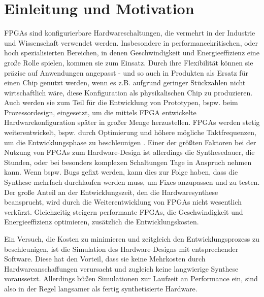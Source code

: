 \chapter{Einleitung und Motivation}

FPGAs sind konfigurierbare Hardwareschaltungen, die vermehrt in der Industrie und Wissenschaft verwendet werden.
Insbesondere in performancekritischen, oder hoch spezialisierten Bereichen, in denen Geschwindigkeit und Energieeffizienz eine große Rolle spielen, kommen sie zum Einsatz.
Durch ihre Flexibilität können sie präzise auf Anwendungen angepasst - und so auch in Produkten als Ersatz für einen Chip genutzt werden, wenn es z.B. aufgrund geringer Stückzahlen nicht wirtschaftlich wäre, diese Konfiguration als physikalischen Chip zu produzieren.
Auch werden sie zum Teil für die Entwicklung von Prototypen, bspw. beim Prozessordesign, eingesetzt, um die mittels FPGA entwickelte Hardwarekonfiguration später in großer Menge herzustellen.
FPGAs werden stetig weiterentwickelt, bspw. durch Optimierung und höhere mögliche Taktfrequenzen, um die Entwicklungsphase zu beschleunigen \textcite{boutros2021fpga, kuon2006measuring}.
Einer der größten Faktoren bei der Nutzung von FPGAs zum Hardware-Design ist allerdings die Synthesedauer, die Stunden, oder bei besonders komplexen Schaltungen Tage in Anspruch nehmen kann.
Wenn bspw. Bugs gefixt werden, kann dies zur Folge haben, dass die Synthese mehrfach durchlaufen werden muss, um Fixes anzupassen und zu testen.
Der große Anteil an der Entwicklungszeit, den die Hardwaresynthese beansprucht, wird durch die Weiterentwicklung von FPGAs nicht wesentlich verkürzt.
Gleichzeitig steigern performante FPGAs, die Geschwindigkeit und Energieeffizienz optimieren, zusätzlich die Entwicklungskosten.

Ein Versuch, die Kosten zu minimieren und zeitgleich den Entwicklungsprozess zu beschleunigen, ist die Simulation des Hardware-Designs mit entsprechender Software.
Diese hat den Vorteil, dass sie keine Mehrkosten durch Hardwareanschaffungen verursacht und zugleich keine langwierige Synthese voraussetzt.
Allerdings büßen Simulationen zur Laufzeit an Performance ein, sind also in der Regel langsamer als fertig synthetisierte Hardware.

